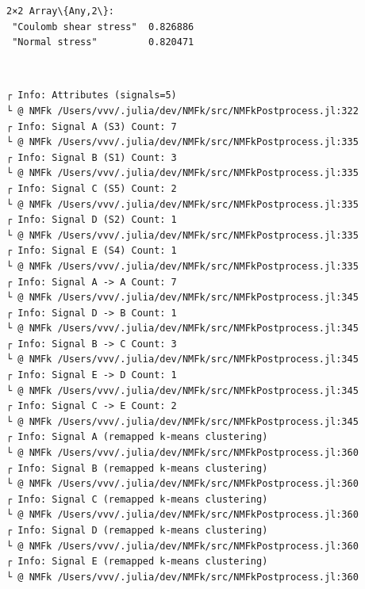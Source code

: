\documentclass[11pt]{article}
\begin{document}
    \begin{Verbatim}[commandchars=\\\{\}]
2×2 Array\{Any,2\}:
 "Coulomb shear stress"  0.826886
 "Normal stress"         0.820471
    \end{Verbatim}


    \begin{center}
    \end{center}
    { \hspace*{\fill} \\}

    \begin{Verbatim}[commandchars=\\\{\}]
┌ Info: Attributes (signals=5)
└ @ NMFk /Users/vvv/.julia/dev/NMFk/src/NMFkPostprocess.jl:322
┌ Info: Signal A (S3) Count: 7
└ @ NMFk /Users/vvv/.julia/dev/NMFk/src/NMFkPostprocess.jl:335
┌ Info: Signal B (S1) Count: 3
└ @ NMFk /Users/vvv/.julia/dev/NMFk/src/NMFkPostprocess.jl:335
┌ Info: Signal C (S5) Count: 2
└ @ NMFk /Users/vvv/.julia/dev/NMFk/src/NMFkPostprocess.jl:335
┌ Info: Signal D (S2) Count: 1
└ @ NMFk /Users/vvv/.julia/dev/NMFk/src/NMFkPostprocess.jl:335
┌ Info: Signal E (S4) Count: 1
└ @ NMFk /Users/vvv/.julia/dev/NMFk/src/NMFkPostprocess.jl:335
┌ Info: Signal A -> A Count: 7
└ @ NMFk /Users/vvv/.julia/dev/NMFk/src/NMFkPostprocess.jl:345
┌ Info: Signal D -> B Count: 1
└ @ NMFk /Users/vvv/.julia/dev/NMFk/src/NMFkPostprocess.jl:345
┌ Info: Signal B -> C Count: 3
└ @ NMFk /Users/vvv/.julia/dev/NMFk/src/NMFkPostprocess.jl:345
┌ Info: Signal E -> D Count: 1
└ @ NMFk /Users/vvv/.julia/dev/NMFk/src/NMFkPostprocess.jl:345
┌ Info: Signal C -> E Count: 2
└ @ NMFk /Users/vvv/.julia/dev/NMFk/src/NMFkPostprocess.jl:345
┌ Info: Signal A (remapped k-means clustering)
└ @ NMFk /Users/vvv/.julia/dev/NMFk/src/NMFkPostprocess.jl:360
┌ Info: Signal B (remapped k-means clustering)
└ @ NMFk /Users/vvv/.julia/dev/NMFk/src/NMFkPostprocess.jl:360
┌ Info: Signal C (remapped k-means clustering)
└ @ NMFk /Users/vvv/.julia/dev/NMFk/src/NMFkPostprocess.jl:360
┌ Info: Signal D (remapped k-means clustering)
└ @ NMFk /Users/vvv/.julia/dev/NMFk/src/NMFkPostprocess.jl:360
┌ Info: Signal E (remapped k-means clustering)
└ @ NMFk /Users/vvv/.julia/dev/NMFk/src/NMFkPostprocess.jl:360
    \end{Verbatim}

    \begin{center}
    \end{center}
    { \hspace*{\fill} \\}
\end{document}
